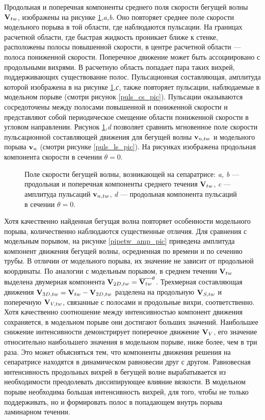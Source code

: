 Продольная и поперечная компоненты среднего поля скорости бегущей волны $\mathbf{V}_{tw}$, изображены на рисунке \ref{pipetw_pic},{\it a,b}. Оно повторяет среднее поле скорости модельного порыва в той области, где наблюдаются пульсации. На границах расчетной области, где быстрая жидкость проникает ближе к стенке, расположены полосы повышенной скорости, в центре расчетной области --- полоса пониженной скорости. Поперечное движение может быть ассоциировано с продольными вихрями. В расчетную область попадает пара таких вихрей, поддерживающих существование полос. Пульсационная составляющая, амплитуда которой изображена в на рисунке \ref{pipetw_pic},{\it с}, также повторяет пульсации, наблюдаемые в модельном порыве (смотри рисунок \ref{puls_cs_pic}). Пульсации оказываются сосредоточены между полосами повышенной и пониженной скорости и представляют собой периодическое смещение области пониженной скорости в угловом направлении. Рисунок \ref{pipetw_pic},{\it d} позволяет сравнить мгновенное поле скорости пульсационной составляющей движения для бегущей волны $\mathbf{v}_{n,tw}$ и модельного порыва $\mathbf{v}_n$ (смотри рисунке \ref{puls_ls_pic}). На рисунках изображена продольная компонента скорости в сечении $\theta = 0$. 
 

\begin{figure}
\caption{Поле скорости бегущей волны, возникающей на сепаратрисе: {\it a, b} --- продольная и поперечная компоненты среднего течения $\mathbf{V}_{tw}$, {\it c} --- амплитуда пульсаций $\mathbf{v}_{n,tw}$, {\it d} --- продольная компонента пульсаций в сечении $\theta = 0$.}
\label{pipetw_pic}
\end{figure}

Хотя качественно найденная бегущая волна повторяет особенности модельного порыва, количественно наблюдаются существенные отличия. Для сравнения с модельным порывом, на рисунке \ref{pipetw_amp_pic} приведена амплитуда компонент движения бегущей волны, осредненная по времени и по сечению трубы. В отличии от модельного порыва, их значение не зависит от продольной координаты. По аналогии с модельным порывом, в среднем течении $\mathbf{V}_{tw}$ выделена двумерная компонента $\mathbf{V}_{2D,tw} = \overline{\mathbf{V}_{tw}}^\theta$. Трехмерная составляющая движения $\mathbf{V}_{3D,tw} = \mathbf{V}_{tw} - \mathbf{V}_{2D,tw}$ разделена на продольную $\mathbf{V}_{S,tw}$ и поперечную $\mathbf{V}_{V,tw}$, связанные с полосами и продольные вихри, соответственно. Хотя качественно соотношение между интенсивностью компонент движения сохраняется, в модельном порыве они достигают больших значений. Наибольшее снижение интенсивности демонстрирует поперечное движение $\mathbf{V}_V$, его значение относительно наибольшего значения в модельном порыве, ниже более, чем в три раза. Это может объясняться тем, что компоненты движения решения на сепаратрисе находятся в динамическом равновесии друг с другом. Равновесная интенсивность продольных вихрей в бегущей волне вырабатывается из необходимости преодолевать диссипирующее влияние вязкости. В модельном порыве необходима большая интенсивность вихрей, для того, чтобы не только поддерживать, но и формировать полос в попадающем внутрь порыва ламинарном течении. 


